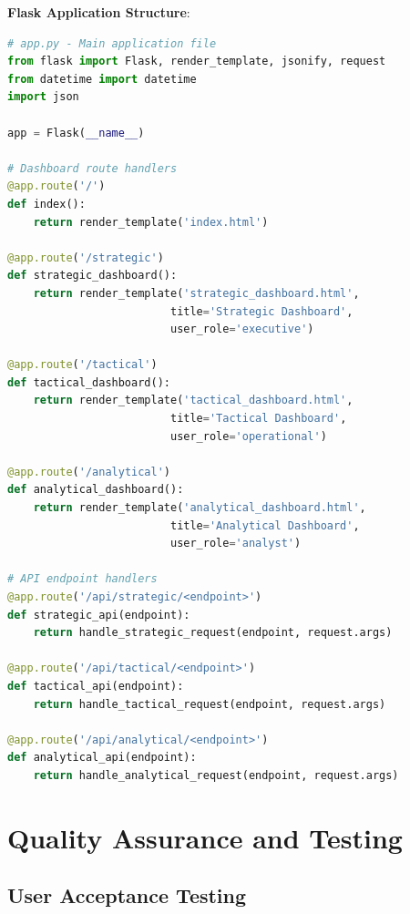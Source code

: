 \documentclass[12pt,a4paper]{article}
\begin{document}
\textbf{Flask Application Structure}:
\begin{lstlisting}[language=Python]
# app.py - Main application file
from flask import Flask, render_template, jsonify, request
from datetime import datetime
import json

app = Flask(__name__)

# Dashboard route handlers
@app.route('/')
def index():
    return render_template('index.html')

@app.route('/strategic')
def strategic_dashboard():
    return render_template('strategic_dashboard.html', 
                         title='Strategic Dashboard',
                         user_role='executive')

@app.route('/tactical')  
def tactical_dashboard():
    return render_template('tactical_dashboard.html',
                         title='Tactical Dashboard', 
                         user_role='operational')

@app.route('/analytical')
def analytical_dashboard():
    return render_template('analytical_dashboard.html',
                         title='Analytical Dashboard',
                         user_role='analyst')

# API endpoint handlers
@app.route('/api/strategic/<endpoint>')
def strategic_api(endpoint):
    return handle_strategic_request(endpoint, request.args)

@app.route('/api/tactical/<endpoint>')  
def tactical_api(endpoint):
    return handle_tactical_request(endpoint, request.args)

@app.route('/api/analytical/<endpoint>')
def analytical_api(endpoint):
    return handle_analytical_request(endpoint, request.args)
\end{lstlisting}

\section{Quality Assurance and Testing}

\subsection{User Acceptance Testing}
\end{document}
